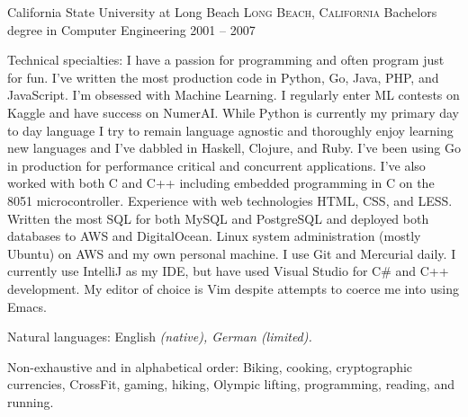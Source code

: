 \documentclass[10pt,a4paper]{article}
\begin{document}
\headedsection
  {California State University at Long Beach}
  {\textsc{Long Beach, California}} {%
  \headedsubsection
    {Bachelors degree in Computer Engineering}
    {2001 -- 2007} 
    {}
}

\spacedhrule{0.5em}{-0.4em}


\inlineheadsection  %
  {Technical specialties:}
  {I have a passion for programming and often program just for fun. I've written the
  most production code in Python, {Go}, Java, PHP, and JavaScript. I'm obsessed with Machine Learning.
  I regularly enter ML contests on Kaggle and have success on NumerAI. While Python is currently my primary 
  day to day language I try to remain language agnostic and thoroughly enjoy learning new
  languages and I've dabbled in {Haskell}, {Clojure}, and {Ruby}. I've been using {Go} in production for performance critical and concurrent
  applications. I've also worked with both C and C++ including embedded programming in C on the 8051 microcontroller. Experience with web 
  technologies {HTML}, {CSS}, and {LESS}. Written the most {SQL} for both {MySQL} and {PostgreSQL} and
  deployed both databases to {AWS} and {DigitalOcean}. Linux system
  administration (mostly Ubuntu) on {AWS} and my own personal machine. 
  I use {Git} and Mercurial daily. I currently use IntelliJ as my IDE, but have used Visual 
  Studio for {C\#} and {C++} development. My editor of choice is Vim despite 
  attempts to coerce me into using Emacs.}

\inlineheadsection
  {Natural languages:}
  {English \emph{(native), German \emph{(limited)}.}}


\spacedhrule{1.6em}{-0.4em}


\inlineheadsection
  {Non-exhaustive and in alphabetical order:}
  {Biking, cooking, cryptographic currencies, CrossFit, gaming, hiking, 
  Olympic lifting, programming, reading, and running.}
\end{document}
